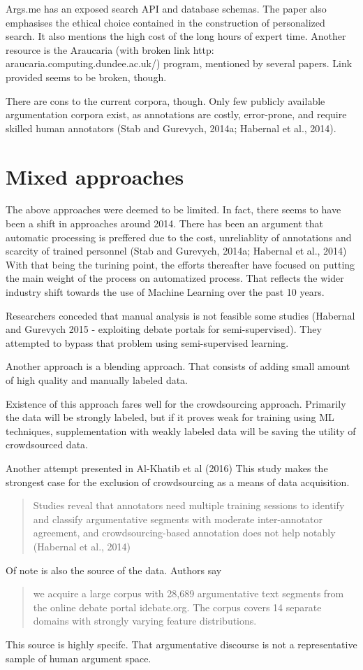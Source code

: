 \documentclass{report}
\begin{document}
Args.me has an exposed search API and database schemas. The paper also emphasises the ethical choice contained in the construction of personalized search.
It also mentions the high cost of the long hours of expert time.
Another resource is the  Araucaria (with broken link  http:\\araucaria.computing.dundee.ac.uk/) program, mentioned by several papers. Link provided seems to be broken, though. 

There are cons to the current corpora, though.
Only few publicly available argumentation corpora exist, as annotations are costly, error-prone, and require skilled human annotators (Stab and Gurevych, 2014a; Habernal et al., 2014).

\section{Mixed approaches}
The above approaches were deemed to be limited. In fact, there seems to have been a shift in approaches around 2014.
There has been an argument that automatic processing is preffered due to the cost, unreliablity of annotations and scarcity of trained personnel
(Stab and Gurevych, 2014a; Habernal et al., 2014)
With that being the turining point, the efforts thereafter have focused on putting the main weight of the process on automatized process. 
That reflects the wider industry shift towards the use of Machine Learning over the past 10 years.

Researchers conceded that manual analysis is not feasible some studies (Habernal and Gurevych 2015 - exploiting debate portals for semi-supervised).
They attempted to bypass that problem using semi-supervised learning.

Another approach is a blending approach.\cite{shnarch_will_2018} That consists of adding small amount of high quality and manually labeled data.

Existence of this approach fares well for the crowdsourcing approach. Primarily the data will be strongly labeled, but if it proves weak for training using ML techniques, 
supplementation with weakly labeled data will be saving the utility of crowdsourced data.

Another attempt presented in Al-Khatib et al (2016) \cite{al-khatib_cross-domain_2016}
This study makes the strongest case for the exclusion of crowdsourcing as a means of data acquisition.
\begin{quote}
 Studies reveal that annotators need multiple training sessions to identify and classify argumentative segments with moderate inter-annotator agreement, and crowdsourcing-based annotation does not help notably (Habernal et al., 2014)
\end{quote}
Of note is also the source of the data. Authors say
\begin{quote}
 we acquire a large corpus with 28,689 argumentative text segments from the online debate portal idebate.org. The corpus covers 14 separate domains with strongly varying feature distributions.
\end{quote}
This source is highly specifc. That argumentative discourse is not a representative sample of human argument space.  
\end{document}
